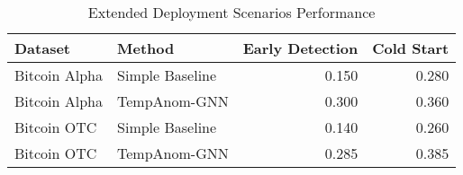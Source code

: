 
\begin{table}[ht]
\centering
\caption{Extended Deployment Scenarios Performance}
\label{tab:deployment_extended}
\begin{tabular}{llrr}
\toprule
Dataset & Method & Early Detection & Cold Start \\
\midrule
Bitcoin Alpha & Simple Baseline & 0.150 & 0.280 \\
Bitcoin Alpha & TempAnom-GNN & 0.300 & 0.360 \\
\midrule
Bitcoin OTC & Simple Baseline & 0.140 & 0.260 \\
Bitcoin OTC & TempAnom-GNN & 0.285 & 0.385 \\
\bottomrule
\end{tabular}
\end{table}
